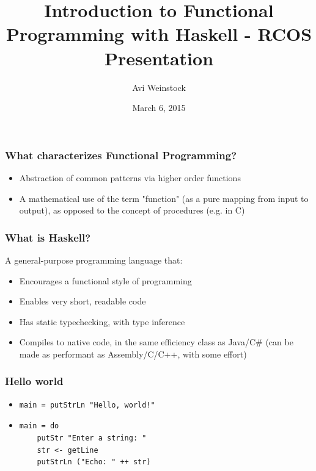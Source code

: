 \documentclass{beamer}
\title{Introduction to Functional Programming with Haskell - RCOS Presentation}
\date{March 6, 2015}
\author{Avi Weinstock}
\begin{document}
\maketitle

\begin{frame}
\frametitle{What characterizes Functional Programming?}
\begin{itemize}
\item
Abstraction of common patterns via higher order functions
\item
A mathematical use of the term "function" (as a pure mapping from input to output), as opposed to the concept of procedures (e.g. in C)
\end{itemize}

\end{frame}
\begin{frame}
\frametitle{What is Haskell?}
A general-purpose programming language that:
\begin{itemize}
\item
Encourages a functional style of programming
\item
Enables very short, readable code
\item
Has static typechecking, with type inference
\item
Compiles to native code, in the same efficiency class as Java/C\# (can be made as performant as Assembly/C/C++, with some effort)
\end{itemize}
\end{frame}

\begin{frame}[fragile]
\frametitle{Hello world}
\begin{itemize}
\item
\begin{Verbatim}[frame=single, fontsize=\scriptsize]
main = putStrLn "Hello, world!"
\end{Verbatim}
\item
\begin{Verbatim}[frame=single, fontsize=\scriptsize]
main = do
    putStr "Enter a string: "
    str <- getLine
    putStrLn ("Echo: " ++ str)
\end{Verbatim}
%    
\end{itemize}
\end{frame}
\end{document}
